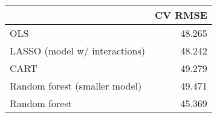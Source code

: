 
\begin{tabular}{lr}
\toprule
  & CV RMSE\\
\midrule
OLS & 48.265\\
LASSO (model w/ interactions) & 48.242\\
CART & 49.279\\
Random forest (smaller model) & 49.471\\
Random forest & 45.369\\
\bottomrule
\end{tabular}